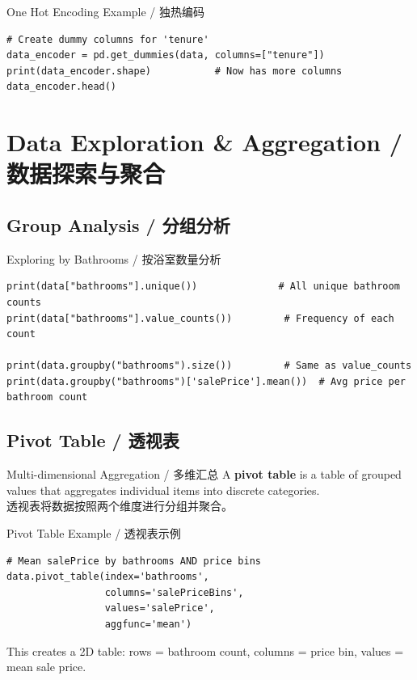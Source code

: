 \documentclass[11pt,a4paper]{article}
\begin{document}
\begin{examplebox}{One Hot Encoding Example / 独热编码}
\begin{lstlisting}
# Create dummy columns for 'tenure'
data_encoder = pd.get_dummies(data, columns=["tenure"])
print(data_encoder.shape)           # Now has more columns
data_encoder.head()
\end{lstlisting}
\end{examplebox}

\section{Data Exploration \& Aggregation / 数据探索与聚合}

\subsection{Group Analysis / 分组分析}

\begin{examplebox}{Exploring by Bathrooms / 按浴室数量分析}
\begin{lstlisting}
print(data["bathrooms"].unique())              # All unique bathroom counts
print(data["bathrooms"].value_counts())         # Frequency of each count

print(data.groupby("bathrooms").size())         # Same as value_counts
print(data.groupby("bathrooms")['salePrice'].mean())  # Avg price per bathroom count
\end{lstlisting}
\end{examplebox}

\subsection{Pivot Table / 透视表}

\begin{concept}{Multi-dimensional Aggregation / 多维汇总}
    A \textbf{pivot table} is a table of grouped values that aggregates individual items into discrete categories. \\
    透视表将数据按照两个维度进行分组并聚合。
\end{concept}

\begin{examplebox}{Pivot Table Example / 透视表示例}
\begin{lstlisting}
# Mean salePrice by bathrooms AND price bins
data.pivot_table(index='bathrooms',
                 columns='salePriceBins',
                 values='salePrice',
                 aggfunc='mean')
\end{lstlisting}
    This creates a 2D table: rows = bathroom count, columns = price bin, values = mean sale price.
\end{examplebox}
\end{document}
